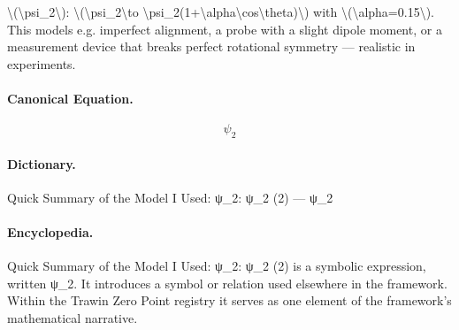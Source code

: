 \textbackslash{}(\textbackslash{}psi\_2\textbackslash{}): \textbackslash{}(\textbackslash{}psi\_2\textbackslash{}to \textbackslash{}psi\_2(1+\textbackslash{}alpha\textbackslash{}cos\textbackslash{}theta)\textbackslash{}) with \textbackslash{}(\textbackslash{}alpha=0.15\textbackslash{}). This models e.g. imperfect alignment, a probe with a slight dipole moment, or a measurement device that breaks perfect rotational symmetry — realistic in experiments.

\paragraph{Canonical Equation.}
\[
\psi_2
\]

\paragraph{Dictionary.}
Quick Summary of the Model I Used: ψ\_2: ψ\_2 (2) — ψ\_2

\paragraph{Encyclopedia.}
Quick Summary of the Model I Used: ψ\_2: ψ\_2 (2) is a symbolic expression, written ψ\_2. It introduces a symbol or relation used elsewhere in the framework. Within the Trawin Zero Point registry it serves as one element of the framework's mathematical narrative.
